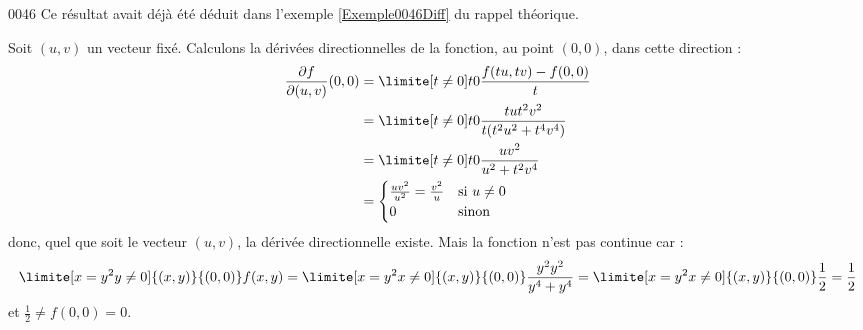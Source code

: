 \begin{corrige}{0046}
Ce résultat avait déjà été déduit dans l'exemple \ref{Exemple0046Diff} du rappel théorique.



\begin{alternative}
	
Soit $(u,v)$ un vecteur fixé. Calculons la dérivées directionnelles de
la fonction, au point $(0,0)$, dans cette direction :
\begin{equation*}
  \begin{split}
    \frac{\partial f}{\partial(u,v)}(0,0) &= \limite[t\neq0] t 0
    \frac{f(tu, tv)   - f(0,0)}{t}\\
    &=\limite[t\neq0] t 0  \frac{t u t^2 v^2}{t(t^2 u^2 + t^4 v^4)}\\
    &=\limite[t\neq0] t 0  \frac{u v^2}{u^2 + t^2 v^4}\\
    &=
    \begin{cases}
      \frac{uv^2}{u^2} = \frac{v^2}u & \text{si $u \neq 0$}\\
      0 & \text{sinon}
    \end{cases}
  \end{split}
\end{equation*}
donc, quel que soit le vecteur $(u,v)$, la dérivée directionnelle
existe. Mais la fonction n'est pas continue car :
\begin{equation*}
  \limite[x=y^2\\y\neq0]{(x,y)}{(0,0)} f(x,y) =%
  \limite[x=y^2\\x\neq0]{(x,y)}{(0,0)} \frac{y^2 y^2}{y^4 + y^4} =%
  \limite[x=y^2\\x\neq0]{(x,y)}{(0,0)} \frac 12 = \frac 12
\end{equation*}
et $\frac12 \neq f(0,0) = 0$.


\end{alternative}

\end{corrige}
